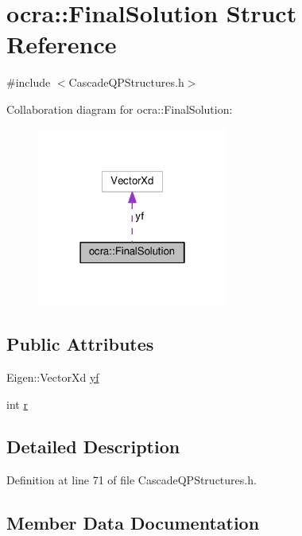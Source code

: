 \hypertarget{structocra_1_1FinalSolution}{}\section{ocra\+:\+:Final\+Solution Struct Reference}
\label{structocra_1_1FinalSolution}


{\ttfamily \#include $<$Cascade\+Q\+P\+Structures.\+h$>$}



Collaboration diagram for ocra\+:\+:Final\+Solution\+:
\nopagebreak
\begin{figure}[H]
\begin{center}
\leavevmode
\includegraphics[width=178pt]{d8/d2c/structocra_1_1FinalSolution__coll__graph}
\end{center}
\end{figure}
\subsection*{Public Attributes}
\begin{DoxyCompactItemize}
\item 
Eigen\+::\+Vector\+Xd \hyperlink{structocra_1_1FinalSolution_a10e9bf5b4c17125d9f3b8b807c627347}{yf}
\item 
int \hyperlink{structocra_1_1FinalSolution_a5d1585ffcc8f9352521c2607a4c119a3}{r}
\end{DoxyCompactItemize}


\subsection{Detailed Description}


Definition at line 71 of file Cascade\+Q\+P\+Structures.\+h.



\subsection{Member Data Documentation}
